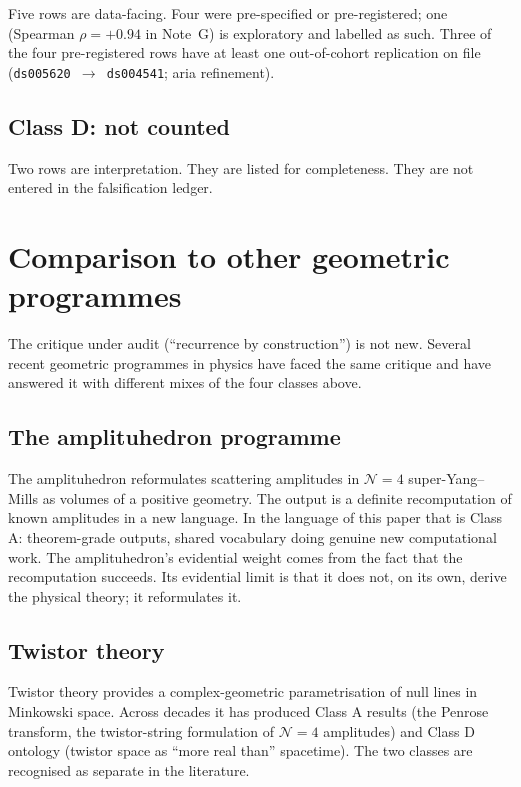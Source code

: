 \documentclass[11pt,a4paper]{article}
\begin{document}
Five rows are data-facing. Four were pre-specified or
pre-registered; one (Spearman $\rho=+0.94$ in Note~G) is
exploratory and labelled as such. Three of the four pre-registered
rows have at least one out-of-cohort replication on file
(\texttt{ds005620 $\to$ ds004541}; aria refinement).

\subsection{Class D: not counted}

Two rows are interpretation. They are listed for completeness.
They are not entered in the falsification ledger.

\section{Comparison to other geometric programmes}
\label{sec:comparison}

The critique under audit (``recurrence by construction'') is not
new. Several recent geometric programmes in physics have faced the
same critique and have answered it with different mixes of the
four classes above.

\subsection{The amplituhedron programme}

The amplituhedron \cite{arkanihamedAmplituhedron} reformulates
scattering amplitudes in $\mathcal{N}=4$ super-Yang--Mills as
volumes of a positive geometry. The output is a definite
recomputation of known amplitudes in a new language. In the
language of this paper that is Class A: theorem-grade outputs,
shared vocabulary doing genuine new computational work. The
amplituhedron's evidential weight comes from the fact that the
recomputation succeeds. Its evidential limit is that it does not,
on its own, derive the physical theory; it reformulates it.

\subsection{Twistor theory}

Twistor theory \cite{penroseTwistor} provides a complex-geometric
parametrisation of null lines in Minkowski space. Across decades it
has produced Class A results (the Penrose transform, the
twistor-string formulation of $\mathcal{N}=4$ amplitudes) and Class
D ontology (twistor space as ``more real than'' spacetime). The
two classes are recognised as separate in the literature.
\end{document}
